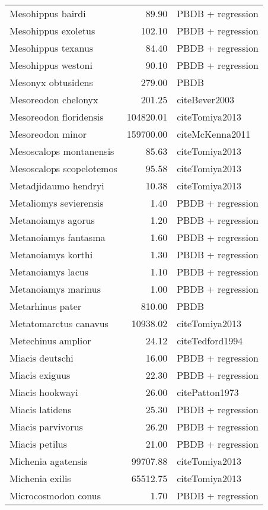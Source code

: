 \begin{table}[ht]
\begin{tabular}{lrl}
  Mesohippus bairdi & 89.90 & PBDB + regression \\ 
  Mesohippus exoletus & 102.10 & PBDB + regression \\ 
  Mesohippus texanus & 84.40 & PBDB + regression \\ 
  Mesohippus westoni & 90.10 & PBDB + regression \\ 
  Mesonyx obtusidens & 279.00 & PBDB \\ 
  Mesoreodon chelonyx & 201.25 & cite{Bever2003} \\ 
  Mesoreodon floridensis & 104820.01 & cite{Tomiya2013} \\ 
  Mesoreodon minor & 159700.00 & cite{McKenna2011} \\ 
  Mesoscalops montanensis & 85.63 & cite{Tomiya2013} \\ 
  Mesoscalops scopelotemos & 95.58 & cite{Tomiya2013} \\ 
  Metadjidaumo hendryi & 10.38 & cite{Tomiya2013} \\ 
  Metaliomys sevierensis & 1.40 & PBDB + regression \\ 
  Metanoiamys agorus & 1.20 & PBDB + regression \\ 
  Metanoiamys fantasma & 1.60 & PBDB + regression \\ 
  Metanoiamys korthi & 1.30 & PBDB + regression \\ 
  Metanoiamys lacus & 1.10 & PBDB + regression \\ 
  Metanoiamys marinus & 1.00 & PBDB + regression \\ 
  Metarhinus pater & 810.00 & PBDB \\ 
  Metatomarctus canavus & 10938.02 & cite{Tomiya2013} \\ 
  Metechinus amplior & 24.12 & cite{Tedford1994} \\ 
  Miacis deutschi & 16.00 & PBDB + regression \\ 
  Miacis exiguus & 22.30 & PBDB + regression \\ 
  Miacis hookwayi & 26.00 & cite{Patton1973} \\ 
  Miacis latidens & 25.30 & PBDB + regression \\ 
  Miacis parvivorus & 26.20 & PBDB + regression \\ 
  Miacis petilus & 21.00 & PBDB + regression \\ 
  Michenia agatensis & 99707.88 & cite{Tomiya2013} \\ 
  Michenia exilis & 65512.75 & cite{Tomiya2013} \\ 
  Microcosmodon conus & 1.70 & PBDB + regression \\ 

\end{tabular}
\end{table}
